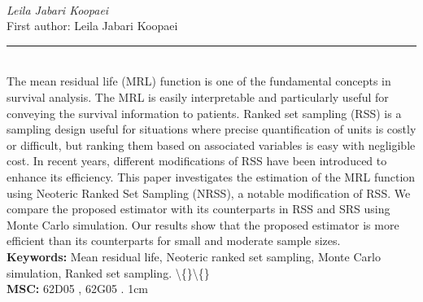 \documentclass[10pt,twoside]{article}
\begin{document}
\noindent\begin{minipage}[t][\textheight]{\textwidth}
\\[0.35em]
{\itshape Leila Jabari Koopaei}\\[0.2em]
{\footnotesize First author: Leila Jabari Koopaei}\\[0.45em]
\noindent\rule{\textwidth}{0.3pt}\\[0.4em]
{\footnotesize  The mean residual life (MRL) function is one of the fundamental concepts in survival analysis. The MRL is easily interpretable and particularly useful for conveying the survival information to patients. Ranked set sampling (RSS) is a sampling design useful for situations where precise quantification of units is costly or difficult, but ranking them based on associated variables is easy with negligible cost. In recent years, different modifications of RSS have been introduced to enhance its efficiency. This paper investigates the estimation of the MRL function using Neoteric Ranked Set Sampling (NRSS), a notable modification of RSS. We compare the proposed estimator with its counterparts in RSS and SRS using Monte Carlo simulation. Our results show that the proposed estimator is more efficient than its counterparts for small and moderate sample sizes.}\\[0.4em]
{\footnotesize\bfseries Keywords:} {\footnotesize Mean residual life, Neoteric ranked set sampling, Monte Carlo simulation, Ranked set sampling. \textbackslash\{\}\textbackslash\{\}}\\[0.15em]
{\footnotesize\bfseries MSC:} {\footnotesize 62D05 , 62G05 . 1cm}\\
\vfill
\end{minipage}
\newpage
\end{document}
